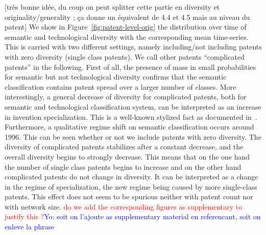 \documentclass[10pt,A4]{article}
\begin{document}
[très bonne idée, du coup on peut splitter cette partie en diversity et originality/generality ; ça donne un équivalent de 4.4 et 4.5 mais au niveau du patent]
We show in Figure~\ref{fig:patent-level-orig} the distribution over time of semantic and technological diversity with the corresponding mean time-series. This is carried with two different settings, namely including/not including patents with zero diversity (single class patents). We call other patents ``complicated patents'' in the following. First of all, the presence of mass in small probabilities for semantic but not technological diversity confirms that the semantic classification contains patent spread over a larger number of classes. More interestingly, a general decrease of diversity for complicated patents, both for semantic and technological classification system, can be interpreted as an increase in invention specialization. This is a well-known stylized fact as documented in~\cite{ARCHIBUGI199279}. Furthermore, a qualitative regime shift on semantic classification occurs around 1996. This can be seen whether or not we include patents with zero diversity. The diversity of complicated patents stabilizes after a constant decrease, and the overall diversity begins to strongly decrease. This means that on the one hand the number of single class patents begins to increase and on the other hand complicated patents do not change in diversity. It can be interpreted as a change in the regime of specialization, the new regime being caused by more single-class patents. This effect does not seem to be spurious neither with patent count nor with network size. \textcolor{red}{do we add the corresponding figures as supplementary to justify this ?}\textcolor{blue}{Yo: soit on l'ajoute as supplementary material en referencant, soit on enleve la phrase}


\end{document}
